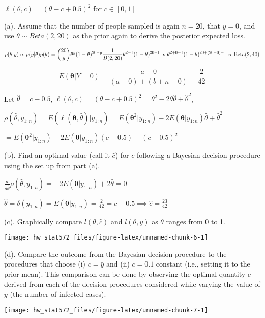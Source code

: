 \documentclass[]{article}
\begin{document}
\(\ell(\theta,c)=(\theta-c + 0.5)^2\) for \(c\in[0,1]\)

(a). Assume that the number of people sampled is again \(n=20\), that
\(y=0\), and use \(\theta\sim Beta(2,20)\) as the prior again to derive
the posterior expected loss.

\[p(\theta| y) \propto p(y| \theta) p(\theta)
=  {20 \choose y}\theta^y (1-\theta)^{20-y}\frac{1}{B(2,20)} \theta^{2-1} (1-\theta)^{20-1}\\
\propto \theta^{2+0-1} (1-\theta)^{20+(20-0)-1}
\propto \text{Beta}(2,40)\]

\[E(\boldsymbol{\theta}| Y=0)=\frac{a+0}{(a+0)+(b+n-0)}=\frac{2}{42}\]

Let \(\hat{\theta}=c-0.5\),
\(\ell(\theta,c)=(\theta-c + 0.5)^2=\theta^2-2\theta \hat{\theta}+\hat{\theta}^2\),

\(\rho(\hat{\theta},y_{1:n}) = E(\ell(\boldsymbol{\theta},\hat{\theta})| y_{1:n})= E(\boldsymbol{\theta}^2| y_{1:n})-2E(\boldsymbol{\theta}| y_{1:n}) \hat{\theta} + \hat{\theta}^2\)

\(= E(\boldsymbol{\theta}^2| y_{1:n})-2E(\boldsymbol{\theta}| y_{1:n})(c-0.5) +(c-0.5)^2\)

(b). Find an optimal value (call it \(\hat c\)) for \(c\) following a
Bayesian decision procedure using the set up from part (a).

\(\frac{d}{d\hat{\theta}}\rho(\hat{\theta},y_{1:n})=-2E(\boldsymbol{\theta}|y_{1:n})+2\hat{\theta}=0\)

\(\hat{\theta}=\delta(y_{1:n}) =E(\boldsymbol{\theta}|y_{1:n})=\frac{2}{42}=c-0.5\implies \hat c=\frac{23}{42}\)

(c). Graphically compare \(l(\theta,\hat c)\) and \(l(\theta,\bar y)\)
as \(\theta\) ranges from 0 to 1.

\begin{center}\texttt{[image: hw\_stat572\_files/figure-latex/unnamed-chunk-6-1]} \end{center}

(d). Compare the outcome from the Bayesian decision procedure to the
procedures that choose (i) \(c=\bar y\) and (ii) \(c=0.1\) constant
(i.e., setting it to the prior mean). This comparison can be done by
observing the optimal quantity \(c\) derived from each of the decision
procedures considered while varying the value of \(y\) (the number of
infected cases).

\begin{center}\texttt{[image: hw\_stat572\_files/figure-latex/unnamed-chunk-7-1]} \end{center}
\end{document}
